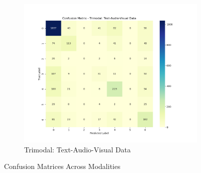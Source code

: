 \begin{figure}[htbp]
    \vspace{0.5cm} %

    \begin{subfigure}[b]{0.45\textwidth}
        \centering
        \includegraphics[width=\textwidth]{figures/text-audio-visual.png}
        \caption{Trimodal: Text-Audio-Visual Data}
    \end{subfigure}

    \caption{Confusion Matrices Across Modalities}
    \label{fig:confusion_matrices}
\end{figure}